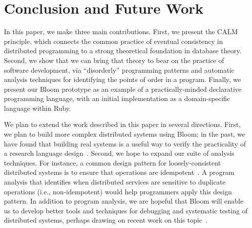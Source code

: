 \section{Conclusion and Future Work}
\label{sec:conclusion}
In this paper, we make three main contributions.  First, we present the CALM
principle, which connects the common practice of eventual consistency in
distributed programming to a strong theoretical foundation in database theory.
Second, we show that we can bring that theory to bear on the practice of
software development, via ``disorderly'' programming patterns and automatic
analysis techniques for identifying the points of order in a program. Finally,
we present our Bloom prototype as an example of a practically-minded declarative
programming language, with an initial implementation as a domain-specific
language within Ruby.

We plan to extend the work described in this paper in several directions. First,
we plan to build more complex distributed systems using Bloom; in the past, we
have found that building real systems is a useful way to verify the practicality
of a research language design~\cite{boom-eurosys}.  Second, we hope to expand
our suite of analysis techniques. For instance, a common design pattern for
loosely-consistent distributed systems is to ensure that operations are
idempotent~\cite{beyond,quicksand}. A program analysis that identifies when
distributed services are sensitive to duplicate operations (i.e.,
non-idempotent) would help programmers apply this design pattern. In addition to
program analysis, we are hopeful that Bloom will enable us to develop better
tools and techniques for debugging and systematic testing of distributed
systems, perhaps drawing on recent work on this topic~\cite{fate-destini}.

